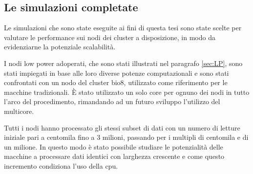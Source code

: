 %
%
 
\subsection{Le simulazioni completate} 
\label{subsec:simc}
Le simulazioni che sono state eseguite ai fini di questa tesi sono state scelte per valutare le performance sui nodi dei cluster a disposizione, in modo da evidenziarne la potenziale scalabilità.

I nodi low power adoperati, che sono stati illustrati nel paragrafo \ref{sec:LP}, sono stati impiegati in base alle loro diverse potenze computazionali e sono stati confrontati con un nodo del cluster bio8, utilizzato come riferimento per le macchine tradizionali.
È stato utilizzato un solo core per ognuno dei nodi in tutto l'arco del procedimento, rimandando ad un futuro sviluppo l'utilizzo del multicore.  


Tutti i nodi hanno processato gli stessi subset di dati con un numero di letture iniziale pari a centomila fino a 3 milioni, passando per i multipli di centomila e di un milione.
In questo modo è stato possibile studiare le potenzialità delle macchine a processare dati identici con larghezza crescente e come questo incremento condiziona l'uso della cpu. 

